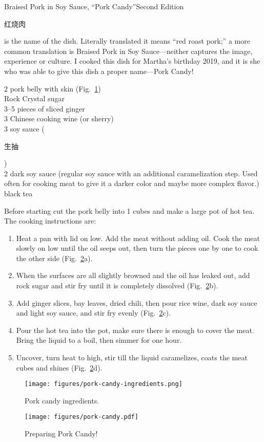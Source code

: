 \begin{entry}{Braised Pork in Soy Sauce, ``Pork Candy''}{Second Edition}
\begin{open}
  \begin{CJK*}{UTF8}{gbsn}红烧肉\end{CJK*} is the name of the dish. Literally translated it means ``red roast pork;'' a more common translation is Braised Pork in Soy Sauce---neither captures the image, experience or culture. I cooked this dish for Martha's birthday 2019, and it is she who was able to give this dish a proper name---Pork Candy!
\end{open}
\begin{ingredients}
  \SI{2}{\pound} pork belly with skin (Fig.~\ref{fig:pork-candy-ingredients})\\
  Rock Crystal sugar\\
  \numrange{3}{5} pieces of sliced ginger\\
  \SI{3}{\tblspoon} Chinese cooking wine (or sherry)\\
  \SI{3}{\tblspoon} soy sauce (\begin{CJK*}{UTF8}{gbsn}生抽\end{CJK*})\\
  \SI{2}{\tblspoon} dark soy sauce (regular soy sauce with an additional
  caramelization step. Used often for cooking meat to give it a darker color and
  maybe more complex flavor.)\\
  black tea
\end{ingredients}
Before starting cut the pork belly into \SI{1}{\inch} cubes and make a large pot
of hot tea.  The cooking instructions are:
\begin{enumerate}
    \item  Heat a pan with lid on low. Add the meat without adding oil. Cook the
    meat slowly on low until the oil seeps out, then turn the pieces one by one
    to cook the other side (Fig.~\ref{fig:pork-candy-prep}a).
    \item When the surfaces are all slightly browned and the oil has leaked out,
    add rock sugar and stir fry until it is completely dissolved
    (Fig.~\ref{fig:pork-candy-prep}b).
    \item Add ginger slices, bay leaves, dried chili, then pour rice wine, dark
    soy sauce and light soy sauce, and stir fry evenly
    (Fig.~\ref{fig:pork-candy-prep}c).
    \item Pour the hot tea into the pot, make sure there is enough to cover the
    meat. Bring the liquid to a boil, then simmer for one hour.
    \item Uncover, turn heat to high, stir till the liquid caramelizes, coats
    the meat cubes and shines (Fig.~\ref{fig:pork-candy-prep}d).
\end{enumerate}
\begin{figure}
  \centering
  \texttt{[image: figures/pork-candy-ingredients.png]}
  \caption{Pork candy ingredients.}
  \label{fig:pork-candy-ingredients}
\end{figure}
\begin{figure}
  \centering
  \texttt{[image: figures/pork-candy.pdf]}
  \caption{Preparing Pork Candy!}
  \label{fig:pork-candy-prep}
\end{figure}


\end{entry}
